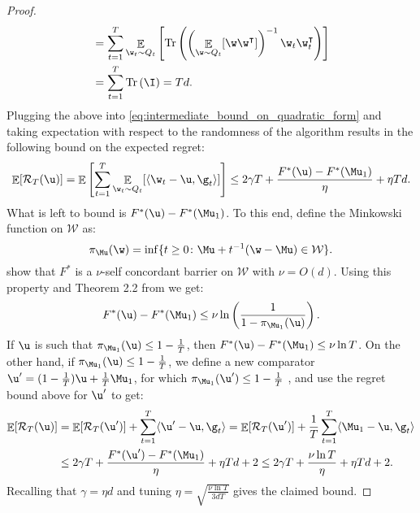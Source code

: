 \documentclass{colt2018} %
\DeclareMathOperator*{\E}{\mathbb{E}}
\DeclareMathOperator{\Tr}{Tr}			%
\renewcommand{\top}{\intercal}
\newcommand{\domainw}{\mathcal{W}}
\newcommand{\inner}[2]{\langle #1, #2 \rangle}  %
\newcommand{\regret}{\mathcal{R}}
\begin{document}
\begin{proof}
\begin{align*}
&= \sum_{t=1}^T \E_{\w_t \sim Q_t} \left[\Tr\left(
  \left(\E_{\w \sim Q_t}[\w\w^\top]\right)^{-1} \w_t \w_t^\top \right) \right] \\
&= \sum_{t=1}^T \Tr\left( \I \right) = Td.
\end{align*}
Plugging the above into \eqref{eq:intermediate_bound_on_quadratic_form} and taking
expectation with respect to the randomness of the algorithm results in
the following bound on
the expected regret:
\[
\E [\regret_T(\u)] 
= \E \left[\sum_{t=1}^T \E_{\w_t \sim Q_t} [\inner{\w_t - \u}{\g_t}]
 \right] 
 \leq 2\gamma T +  \frac{F^*(\u) - F^*(\Mu_1)}{\eta} + \eta Td.
\]
What is left to bound is $F^*(\u) - F^*(\Mu_1)$. 
To this end, define
the Minkowski function \citep{Scrible}
% 
on $\domainw$ as:
\[
\pi_{\Mu}(\w) = \inf\{t \geq 0 \colon \Mu + t^{-1}(\w - \Mu) \in \domainw\}.
\]
\citet{bubeck2014} show
that $F^*$
is a $\nu$-self concordant barrier on $\mathcal{\domainw}$ with $\nu = O(d)$. 
Using this property and Theorem 2.2 from \cite{Scrible} we get:
\[
  F^*(\u) - F^*(\Mu_1) \leq \nu \ln \left(\frac{1}{1-\pi_{\Mu_1}(\u)}\right).
\]
If $\u$ is such that $\pi_{\Mu_1}(\u) \leq 1 - \frac{1}{T}$, then
$F^*(\u) - F^*(\Mu_1) \leq \nu \ln T$.
On the other hand, if $\pi_{\Mu_1}(\u) \leq 1 - \frac{1}{T}$, we define
a new comparator $\u' = (1-\frac{1}{T}) \u + \frac{1}{T}\Mu_1$, for which
$\pi_{\Mu_1}(\u') \leq 1 - \frac{1}{T}$ \citep{Scrible}, and use the regret bound above
for $\u'$ to get:
\begin{align*}
  \E [\regret_T(\u)] &=\E [\regret_T(\u')] + \sum_{t=1}^T \inner{\u' - \u}{\g_t} 
                     =\E [\regret_T(\u')] + \frac{1}{T} \sum_{t=1}^T \inner{\Mu_1-\u}{\g_t}  \\
                     &\leq 2\gamma T +  \frac{F^*(\u') - F^*(\Mu_1)}{\eta} + \eta T d + 2
                     \leq  2\gamma T + \frac{\nu \ln T}{\eta} +  \eta T
                     d + 2.
\end{align*}
Recalling that $\gamma = \eta d$ and tuning $\eta = \sqrt{\frac{\nu \ln T}{3 d T}}$
gives the claimed bound.
\end{proof}
\end{document}

